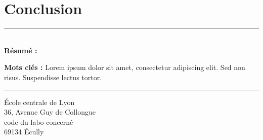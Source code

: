 \documentclass[a4paper,12pt,french]{article}
\begin{document}

\section{Conclusion}


\lipsum[1]


%
%



\newpage
\thispagestyle{empty}

\vspace*{\fill}
\noindent\rule[2pt]{\textwidth}{0.5pt}\\
{\textbf{Résumé :}}
\lipsum[1]

{\noindent\textbf{Mots clés :}}
Lorem ipsum dolor sit amet, consectetur adipiscing elit. Sed non risus. Suspendisse lectus tortor.
\\
\noindent\rule[2pt]{\textwidth}{0.5pt}
\begin{center}
  École centrale de Lyon\\
  36, Avenue Guy de Collongue\\
  code du labo concerné\\
  69134 Écully
\end{center}
\vspace*{\fill}
\end{document}
